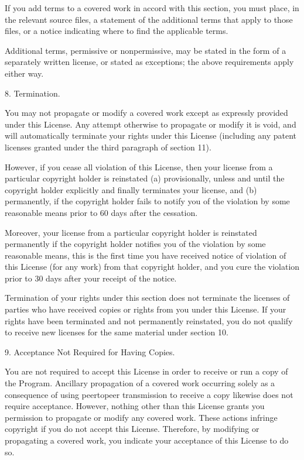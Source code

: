 \documentclass[letterpaper,10pt,english]{sphinxmanual}
\begin{document}
\begin{sphinxVerbatim}[commandchars=\\\{\}]
  If you add terms to a covered work in accord with this section, you
must place, in the relevant source files, a statement of the
additional terms that apply to those files, or a notice indicating
where to find the applicable terms.

  Additional terms, permissive or non\PYGZhy{}permissive, may be stated in the
form of a separately written license, or stated as exceptions;
the above requirements apply either way.

  8. Termination.

  You may not propagate or modify a covered work except as expressly
provided under this License.  Any attempt otherwise to propagate or
modify it is void, and will automatically terminate your rights under
this License (including any patent licenses granted under the third
paragraph of section 11).

  However, if you cease all violation of this License, then your
license from a particular copyright holder is reinstated (a)
provisionally, unless and until the copyright holder explicitly and
finally terminates your license, and (b) permanently, if the copyright
holder fails to notify you of the violation by some reasonable means
prior to 60 days after the cessation.

  Moreover, your license from a particular copyright holder is
reinstated permanently if the copyright holder notifies you of the
violation by some reasonable means, this is the first time you have
received notice of violation of this License (for any work) from that
copyright holder, and you cure the violation prior to 30 days after
your receipt of the notice.

  Termination of your rights under this section does not terminate the
licenses of parties who have received copies or rights from you under
this License.  If your rights have been terminated and not permanently
reinstated, you do not qualify to receive new licenses for the same
material under section 10.

  9. Acceptance Not Required for Having Copies.

  You are not required to accept this License in order to receive or
run a copy of the Program.  Ancillary propagation of a covered work
occurring solely as a consequence of using peer\PYGZhy{}to\PYGZhy{}peer transmission
to receive a copy likewise does not require acceptance.  However,
nothing other than this License grants you permission to propagate or
modify any covered work.  These actions infringe copyright if you do
not accept this License.  Therefore, by modifying or propagating a
covered work, you indicate your acceptance of this License to do so.


\end{sphinxVerbatim}
\end{document}
